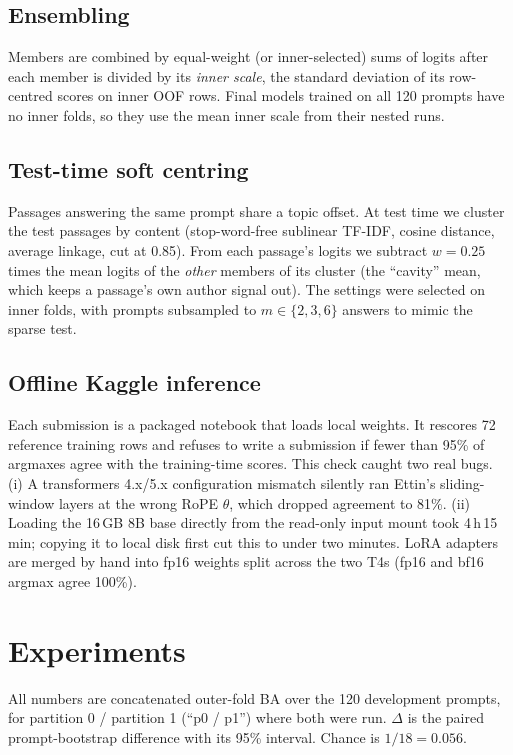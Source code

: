 \documentclass[10pt,twocolumn,letterpaper]{article}
\begin{document}
\subsection{Ensembling}
Members are combined by equal-weight (or inner-selected) sums of logits after each member is divided by its \emph{inner scale}, the standard deviation of its row-centred scores on inner OOF rows. Final models trained on all 120 prompts have no inner folds, so they use the mean inner scale from their nested runs.

\subsection{Test-time soft centring}
\label{sec:centring}
Passages answering the same prompt share a topic offset. At test time we cluster the test passages by content (stop-word-free sublinear TF-IDF, cosine distance, average linkage, cut at 0.85). From each passage's logits we subtract $w=0.25$ times the mean logits of the \emph{other} members of its cluster (the ``cavity'' mean, which keeps a passage's own author signal out). The settings were selected on inner folds, with prompts subsampled to $m\in\{2,3,6\}$ answers to mimic the sparse test.

\subsection{Offline Kaggle inference}
Each submission is a packaged notebook that loads local weights. It rescores 72 reference training rows and refuses to write a submission if fewer than 95\% of argmaxes agree with the training-time scores. This check caught two real bugs. (i) A transformers 4.x/5.x configuration mismatch silently ran Ettin's sliding-window layers at the wrong RoPE $\theta$, which dropped agreement to 81\%. (ii) Loading the 16\,GB 8B base directly from the read-only input mount took 4\,h\,15\,min; copying it to local disk first cut this to under two minutes. LoRA adapters are merged by hand into fp16 weights split across the two T4s (fp16 and bf16 argmax agree 100\%).

\section{Experiments}
\label{sec:experiments}

All numbers are concatenated outer-fold BA over the 120 development prompts, for partition 0 / partition 1 (``p0 / p1'') where both were run. $\Delta$ is the paired prompt-bootstrap difference with its 95\% interval. Chance is $1/18=0.056$.
\end{document}
